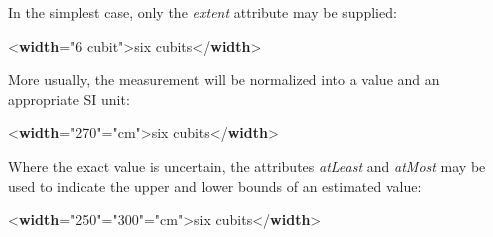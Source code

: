 In the simplest case, only the {\itshape extent} attribute may be supplied: \par\bgroup{}\exampleFont \begin{shaded}\noindent\mbox{}{<\textbf{width}\hspace*{1em}{extent}="{6 cubit}">}six\mbox{}\newline 
 cubits{</\textbf{width}>}\end{shaded}\egroup\par \noindent  More usually, the measurement will be normalized into a value and an appropriate SI unit: \par\bgroup{}\exampleFont \begin{shaded}\noindent\mbox{}{<\textbf{width}\hspace*{1em}{quantity}="{270}"\hspace*{1em}{unit}="{cm}">}six cubits{</\textbf{width}>}\end{shaded}\egroup\par \noindent  Where the exact value is uncertain, the attributes {\itshape atLeast} and {\itshape atMost} may be used to indicate the upper and lower bounds of an estimated value: \par\bgroup{}\exampleFont \begin{shaded}\noindent\mbox{}{<\textbf{width}\hspace*{1em}{atLeast}="{250}"\hspace*{1em}{atMost}="{300}"\hspace*{1em}{unit}="{cm}">}six cubits{</\textbf{width}>}\end{shaded}\egroup\par \par
